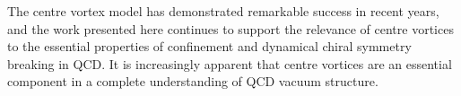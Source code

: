 The centre vortex model has demonstrated remarkable success in recent years, and the work presented here continues to support the relevance of centre vortices to the essential properties of confinement and dynamical chiral symmetry breaking in QCD. It is increasingly apparent that centre vortices are an essential component in a complete understanding of QCD vacuum structure.
